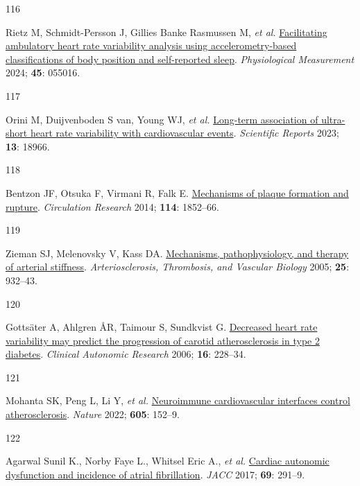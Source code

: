 \documentclass[
  a4paper,
  headsepline=true,
  open=left]{scrbook}
\newlength{\cslhangindent}
\newlength{\csllabelwidth}
\newlength{\cslentryspacingunit} %
\newenvironment{CSLReferences}[2] %
 {%
  \setlength{\parindent}{0pt}
  \ifodd #1
  \let\oldpar\par
  \def\par{\hangindent=\cslhangindent\oldpar}
  \fi
  \setlength{\parskip}{#2\cslentryspacingunit}
 }%
 {}
\newcommand{\CSLLeftMargin}[1]{\parbox[t]{\csllabelwidth}{#1}}
\newcommand{\CSLRightInline}[1]{\parbox[t]{\linewidth - \csllabelwidth}{#1}\break}
\begin{document}
\begin{CSLReferences}{0}{0}
\leavevmode{}%
\CSLLeftMargin{116 }%
\CSLRightInline{Rietz M, Schmidt-Persson J, Gillies Banke Rasmussen M,
\emph{et al.}
\href{https://doi.org/10.1088/1361-6579/ad450d}{Facilitating ambulatory
heart rate variability analysis using accelerometry-based
classifications of body position and self-reported sleep}.
\emph{Physiological Measurement} 2024; \textbf{45}: 055016.}

\leavevmode{}%
\CSLLeftMargin{117 }%
\CSLRightInline{Orini M, Duijvenboden S van, Young WJ, \emph{et al.}
\href{https://doi.org/10.1038/s41598-023-45988-2}{Long-term association
of ultra-short heart rate variability with cardiovascular events}.
\emph{Scientific Reports} 2023; \textbf{13}: 18966.}

\leavevmode{}%
\CSLLeftMargin{118 }%
\CSLRightInline{Bentzon JF, Otsuka F, Virmani R, Falk E.
\href{https://doi.org/10.1161/CIRCRESAHA.114.302721}{Mechanisms of
plaque formation and rupture}. \emph{Circulation Research} 2014;
\textbf{114}: 1852--66.}

\leavevmode{}%
\CSLLeftMargin{119 }%
\CSLRightInline{Zieman SJ, Melenovsky V, Kass DA.
\href{https://doi.org/10.1161/01.ATV.0000160548.78317.29}{Mechanisms,
pathophysiology, and therapy of arterial stiffness}.
\emph{Arteriosclerosis, Thrombosis, and Vascular Biology} 2005;
\textbf{25}: 932--43.}

\leavevmode{}%
\CSLLeftMargin{120 }%
\CSLRightInline{Gottsäter A, Ahlgren ÅR, Taimour S, Sundkvist G.
\href{https://doi.org/10.1007/s10286-006-0345-4}{Decreased heart rate
variability may predict the progression of carotid atherosclerosis in
type 2 diabetes}. \emph{Clinical Autonomic Research} 2006; \textbf{16}:
228--34.}

\leavevmode{}%
\CSLLeftMargin{121 }%
\CSLRightInline{Mohanta SK, Peng L, Li Y, \emph{et al.}
\href{https://doi.org/10.1038/s41586-022-04673-6}{Neuroimmune
cardiovascular interfaces control atherosclerosis}. \emph{Nature} 2022;
\textbf{605}: 152--9.}

\leavevmode{}%
\CSLLeftMargin{122 }%
\CSLRightInline{Agarwal Sunil K., Norby Faye L., Whitsel Eric A.,
\emph{et al.} \href{https://doi.org/10.1016/j.jacc.2016.10.059}{Cardiac
autonomic dysfunction and incidence of atrial fibrillation}. \emph{JACC}
2017; \textbf{69}: 291--9.}


\end{CSLReferences}
\end{document}
